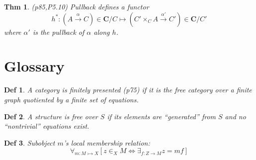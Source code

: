 \documentclass[10pt,twocolumn,letterpaper]{amsart}
\newtheorem{thm}{Thm}[section]
\newtheorem{dfn}{Def}[section]
\newcommand{\brak}[1]{\left[{#1}\right]}
\newcommand{\defn}[1]{\label{dfn:#1}{\em #1}}
\begin{document}
  \begin{thm}(p85,P5.10) Pullback defines a functor
    \[ h^* : (A \stackrel{\alpha}{\to} C) \in \mathbf{C}/C
       \mapsto (C' \times_C A \stackrel{\alpha'}{\to} C') \in \mathbf{C}/C' \]
    where $\alpha'$ is the pullback of $\alpha$ along $h$.
  \end{thm}

\section{Glossary}

  \begin{dfn}A category is \defn{finitely presented} (p75) if it is the
  free category over a finite graph quotiented by a finite set of equations.
  \end{dfn}

  \begin{dfn}
  A structure is \defn{free} over $S$ if its elements are ``generated''
  from $S$ and no ``nontrivial'' equations exist.
  \end{dfn}

  \begin{dfn}Subobject $m$'s \defn{local membership relation}:
          \[ \forall_{m : M \rightarrowtail X}
             \brak{ z \in_X M \Leftrightarrow \exists_{f:Z \to M} z = mf} \] 
  \end{dfn}
\end{document}
